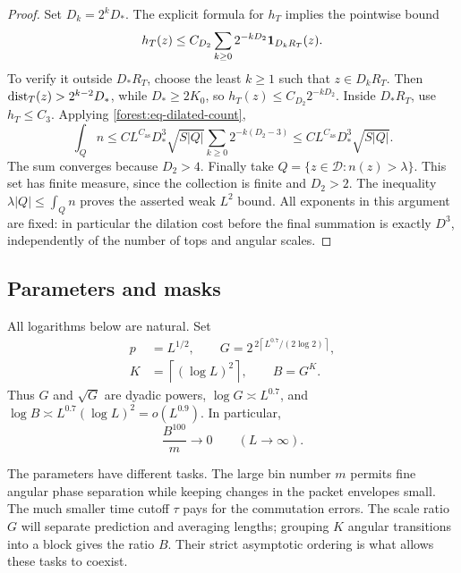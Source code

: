 \begin{proof}
Set \(D_k=2^kD_*\). The explicit formula for \(h_T\) implies
the pointwise bound
\[
 h_T(z)\le C_{D_2}\sum_{k\ge0}2^{-kD_2}\mathbf 1_{D_kR_T}(z).
\]
To verify it outside \(D_*R_T\), choose the least \(k\ge1\)
such that \(z\in D_kR_T\). Then
\(\operatorname{dist}_T(z)>2^{k-2}D_*\), while \(D_*\ge2K_0\), so
\(h_T(z)\le C_{D_2}2^{-kD_2}\). Inside \(D_*R_T\), use
\(h_T\le C_3\). Applying \eqref{forest:eq-dilated-count},
\begin{equation}\label{forest:eq-testing-count}
 \int_Q n
 \le C L^{C_{\mathrm{as}}}D_*^3\sqrt{S|Q|}
       \sum_{k\ge0}2^{-k(D_2-3)}
 \le C L^{C_{\mathrm{as}}}D_*^3\sqrt{S|Q|}.
\end{equation}
The sum converges because \(D_2>4\). Finally take
\(Q=\{z\in\mathcal D:n(z)>\lambda\}\). This set has finite
measure, since the collection is finite and \(D_2>2\). The
inequality \(\lambda|Q|\le\int_Q n\) proves the asserted weak
\(L^2\) bound. All exponents in this argument are fixed: in
particular the dilation cost before the final summation is exactly
\(D^3\), independently of the number of tops and angular scales.
\end{proof}

\subsection{Parameters and masks}

All logarithms below are natural. Set
\begin{equation}\label{forest:eq-parameters}
 \begin{split}
 p&=L^{1/2},\qquad
 G=2^{\,2\left\lceil L^{0.7}/(2\log2)\right\rceil},\\
 K&=\left\lceil(\log L)^2\right\rceil,
 \qquad B=G^K.
 \end{split}
\end{equation}
Thus \(G\) and \(\sqrt G\) are dyadic powers,
\(\log G\asymp L^{0.7}\), and
\(\log B\asymp L^{0.7}(\log L)^2=o(L^{0.9})\).
In particular,
\begin{equation}\label{forest:eq-scale-separation}
 \frac{B^{100}}m\longrightarrow0\qquad(L\longrightarrow\infty).
\end{equation}

The parameters have different tasks. The large bin number \(m\)
permits fine angular phase separation while keeping changes in the
packet envelopes small. The much smaller time cutoff \(\tau\) pays
for the commutation errors. The scale ratio \(G\) will separate
prediction and averaging lengths; grouping \(K\) angular transitions
into a block gives the ratio \(B\). Their strict asymptotic ordering
is what allows these tasks to coexist.

